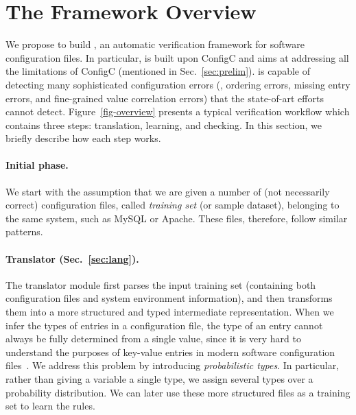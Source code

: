 
\section{The \app Framework Overview}
\label{sec:overview}

We propose to build \app, an automatic verification framework for 
software configuration files.
In particular, \app is built upon ConfigC and aims at addressing
all the limitations of ConfigC (mentioned in Sec.~\ref{sec:prelim}).
\app is capable of detecting many sophisticated 
configuration errors (\eg, ordering errors, missing entry errors,
and fine-grained value correlation errors) that the
state-of-art efforts cannot detect. 
Figure~\ref{fig-overview} presents
a typical \app verification workflow which contains three steps:
translation, learning, and checking. In this section, we briefly
describe how each step works.

\paragraph{Initial phase.}
We start with the assumption 
that we are given a number of (not necessarily correct) 
configuration files, called {\em training set} (or sample dataset), 
belonging to the same system, such as MySQL or Apache. 
These files, therefore, follow similar patterns.

\paragraph{Translator (Sec.~\ref{sec:lang}).}
The translator module first parses the input training 
set (containing both configuration files and system environment
information), and then transforms them into a more structured
and typed intermediate representation.
When we infer the types of entries in a configuration file, 
the type of an entry cannot always be fully determined from 
a single value, since it is very hard to understand
the purposes of key-value entries in modern
software configuration files~\cite{xu15hey}.
We address this problem 
by introducing {\em probabilistic types}.
In particular, rather than giving a variable a single type, 
we assign several types over a probability distribution. 
We can later use these more structured files
as a training set to learn the rules. 

